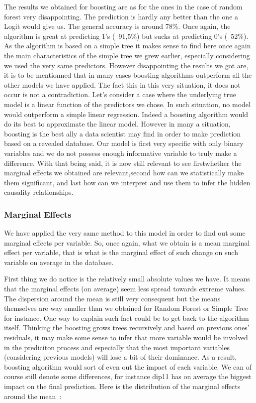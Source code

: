 The results we obtained for boosting are as for the ones in the case of random forest very disappointing. The prediction is hardly any better than the one a Logit would give us. The general accuracy is around 78\%. Once again, the algorithm is great at predicting 1’s (~91,5\%) but sucks at predicting 0’s (~52\%). As the algorithm is based on a simple tree it makes sense to find here once again the main characteristics of the simple tree we grew earlier, especially considering we used the very same predictors.
However disappointing the results we got are, it is to be mentionned that in many cases boosting algorithms outperform all the other models we have applied. The fact this in this very situation, it does not occur is not a contradiction. Let’s consider a case where the underlying true model is a linear function of the predictors we chose. In such situation, no model would outperform a simple linear regression. Indeed a boosting algorithm would do its best to approximate the linear model. However in many a situation, boosting is the best ally a data scientist may find in order to make prediction based on a revealed database.
Our model is first very specific with only binary variables and we do not possess enough informative variable to truly make a difference.
With that being said, it is now still relevant to see  firstwhether the marginal effects we obtained are relevant,second how can we statistically make them significant, and last how can we interpret and use them to infer the hidden causality relationships.

\subsubsection{Marginal Effects}

We have applied the very same method to this model in order to find out some marginal effects per variable. So, once again, what we obtain is a mean marginal effect per variable, that is what is the marginal effect of such change on such variable on average in the database.


First thing we do notice is the relatively small absolute values we have. It means that the marginal effects (on average) seem less spread towards extreme values. The dispersion around the mean is still very consequent but the means themselves are way smaller than we obtained for Random Forest or Simple Tree for instance. One way to explain such fact could be to get back to the algorithm itself. Thinking the boosting grows trees recursively and based on previous ones’ residuals, it may make some sense to infer that more variable would be involved in the prediciton process and especially that the most important variables (considering previous models) will lose a bit of their dominance. As a result, boosting algorithm would sort of even out the impact of each variable.
We can of course still denote some differences, for instance dip11 has on average the biggest impact on the final prediction. Here is the distribution of the marginal effects around the mean :

